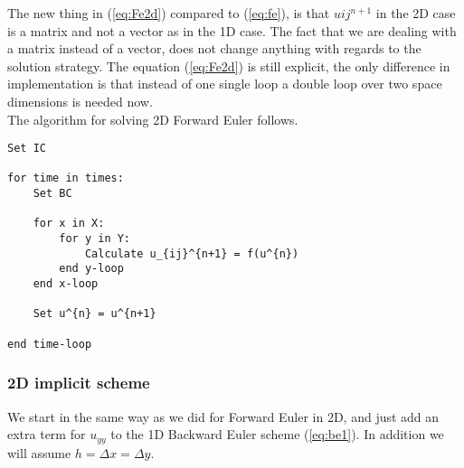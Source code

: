 \documentclass{article}
\begin{document}
The new thing in (\ref{eq:Fe2d}) compared to (\ref{eq:fe}), is that $u{ij}^{n+1}$ in the 2D case is a matrix and not a vector as in the 1D case. The fact that we are dealing with a matrix instead of a vector, does not change anything with regards to the solution strategy. The equation (\ref{eq:Fe2d}) is still explicit, the only difference in implementation is that instead of one single loop a double loop over two space dimensions is needed now.\\

The algorithm for solving 2D Forward Euler follows.

\begin{lstlisting}
Set IC

for time in times:
	Set BC
	
	for x in X:
		for y in Y:
			Calculate u_{ij}^{n+1} = f(u^{n})
		end y-loop
	end x-loop
	
	Set u^{n} = u^{n+1}	
	
end time-loop
\end{lstlisting}

\subsubsection{2D implicit scheme}
We start in the same way as we did for Forward Euler in 2D, and just add an extra term for $u_{yy}$ to the 1D Backward Euler scheme (\ref{eq:be1}). In addition we will assume $h = \Delta x = \Delta y$.
\end{document}
